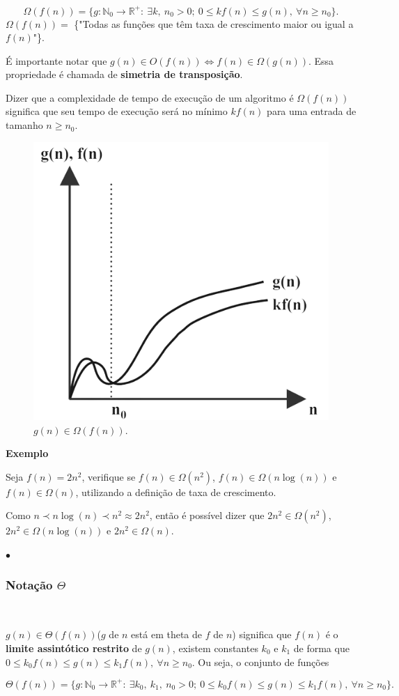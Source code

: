 \[\Omega(f(n)) = \{g: \mathbb{N}_0 \rightarrow \mathbb{R}^{+}: \ \exists k, \ n_0 > 0 ; \ 0\leq kf(n) \leq g(n), \ \forall n \geq n_0\}.\]
$\Omega(f(n))=$ \{"Todas as funções que têm taxa de crescimento maior ou igual a $f(n)$"\}.

É importante notar que $g(n)\in O(f(n)) \Leftrightarrow f(n)\in \Omega(g(n))$. Essa propriedade é chamada de \textbf{simetria de transposição}.

Dizer que a complexidade de tempo de execução de um algoritmo é $\Omega(f(n))$ significa que seu tempo de execução será no mínimo $kf(n)$ para uma entrada de tamanho $n\geq n_0$.

\begin{figure}
  \centering
  \includegraphics[width=0.4\linewidth]{img/Omega.png}
    \caption{$g(n)\in\Omega(f(n))$.}
    \label{Omega}
\end{figure}

\textbf{Exemplo}

Seja $f(n)=2n^2$, verifique se $f(n)\in\Omega(n^2)$, $f(n)\in\Omega(n\log(n))$ e $f(n)\in\Omega(n)$, utilizando a definição de taxa de crescimento.

Como $n \prec n\log(n) \prec n^2 \approx 2n^2$, então é possível dizer que $2n^2\in\Omega(n^2)$, $2n^2\in\Omega(n\log(n))$ e $2n^2\in\Omega(n)$.

{\raggedleft $\bullet$ \par}

\subsubsection{Notação $\Theta$}
\

$g(n)\in\Theta(f(n))$($g$ de $n$ está em theta de $f$ de $n$) significa que $f(n)$ é o \textbf{limite assintótico restrito} de $g(n)$, existem constantes $k_0$ e $k_1$ de forma que $0\leq k_0f(n) \leq g(n) \leq k_1f(n), \ \forall n\geq n_0$. Ou seja, o conjunto de funções

\[\Theta(f(n))=\{g: \mathbb{N}_0 \rightarrow \mathbb{R}^{+}: \ \exists k_0, \ k_1, \ n_0 > 0; \ 0\leq k_0f(n) \leq g(n) \leq k_1f(n), \ \forall n \geq n_0 \}.\]

